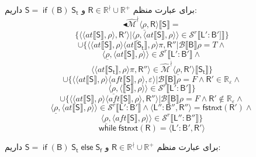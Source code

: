 برای عبارت منظم 
$\mathsf{R} \in \mathbb{R}^\nmid \cup \mathbb{R^+}$
و 
$\mathsf{S= \; if \; (B) \; S_t}$
داریم:
$$\blacktriangleleft\mathcal{\hat{M}^\nmid} \langle \underline{\rho},\mathsf{R} \rangle \llbracket \mathsf{S} \rrbracket=$$
$$\{\langle \langle at \llbracket \mathsf{S} \rrbracket , \rho \rangle , \mathsf{R'} \rangle | \langle \underline{\rho} , \langle at \llbracket \mathsf{S} \rrbracket , \rho \rangle \rangle \in \mathcal{S}^r \llbracket \mathsf{L':B'} ]\rrbracket \}$$
$$\cup \{\langle \langle at \llbracket \mathsf{S} \rrbracket , \rho \rangle \langle at \llbracket \mathsf{S_t} \rrbracket, \rho \rangle \pi, \mathsf{R''} | \mathcal{B}\llbracket\mathsf{B} \rrbracket \rho = \mathit{T} \land$$
$$\langle \underline{\rho},\langle at \llbracket \mathsf{S} \rrbracket , \rho \rangle \rangle \in \mathcal{S}^r \llbracket \mathsf{L':B'} \rrbracket \land$$
$$\langle \langle at \llbracket \mathsf{S_t} \rrbracket , \rho \rangle \pi,\mathsf{R''} \rangle \in \mathcal{\hat{M}^\nmid} \langle \underline{\rho}, \mathsf{R'} \rangle\llbracket \mathsf{S_t} \rrbracket \}$$
$$\cup \{\langle \langle at \llbracket \mathsf{S} \rrbracket, \rho \rangle \langle aft \llbracket \mathsf{S} \rrbracket , \rho \rangle , \varepsilon \rangle | \mathcal{B}\llbracket \mathsf{B} \rrbracket \rho = \mathit{F} \land \mathsf{R'} \in \mathbb{R_\varepsilon} \land$$
$$\langle \underline{\rho} , \langle \llbracket \mathsf{S} \rrbracket , \rho \rangle \rangle \in \mathcal{S}^r \llbracket \mathsf{L':B'} \rrbracket\}$$
$$\cup \{\langle \langle at \llbracket \mathsf{S} \rrbracket , \rho \rangle \langle aft \llbracket \mathsf{S} \rrbracket , \rho \rangle , \mathsf{R''} \rangle | \mathcal{B} \llbracket \mathsf{B} \rrbracket \rho = \mathit{F} \land \mathsf{R'} \notin \mathbb{R_\varepsilon} \land$$
$$\langle \underline{\rho}, \langle at \llbracket \mathsf{S} \rrbracket , \rho \rangle \rangle \in \mathcal{S}^r\llbracket \mathsf{L':B'} \rrbracket \land \langle \mathsf{L'':B''} , \mathsf{R''} \rangle = \mathsf{fstnxt(R')} \land$$
$$\langle \underline{\rho}, \langle aft \llbracket \mathsf{S} \rrbracket , \rho \rangle \rangle \in \mathcal{S}^r \llbracket \mathsf{L'':B''} \rrbracket \}$$
$$\mathsf{while \; fstnxt(R)=\langle L':B', R' \rangle}$$


برای عبارت منظم 
$\mathsf{R} \in \mathbb{R}^\nmid \cup \mathbb{R^+}$
و 
$\mathsf{S= \; if \; (B) \; S_t \; else \; S_f}$
داریم:

